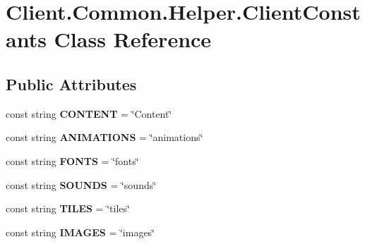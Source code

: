 \hypertarget{classClient_1_1Common_1_1Helper_1_1ClientConstants}{\section{Client.\-Common.\-Helper.\-Client\-Constants Class Reference}
\label{classClient_1_1Common_1_1Helper_1_1ClientConstants}
}
\subsection*{Public Attributes}
\begin{DoxyCompactItemize}
\item 
\hypertarget{classClient_1_1Common_1_1Helper_1_1ClientConstants_a0c4448ce7b1a345e18f40fb7f1c963c7}{const string {\bfseries C\-O\-N\-T\-E\-N\-T} = \char`\"{}Content\char`\"{}}\label{classClient_1_1Common_1_1Helper_1_1ClientConstants_a0c4448ce7b1a345e18f40fb7f1c963c7}

\item 
\hypertarget{classClient_1_1Common_1_1Helper_1_1ClientConstants_a60ef84449ad577edc5a9271ff579ba8f}{const string {\bfseries A\-N\-I\-M\-A\-T\-I\-O\-N\-S} = \char`\"{}animations\char`\"{}}\label{classClient_1_1Common_1_1Helper_1_1ClientConstants_a60ef84449ad577edc5a9271ff579ba8f}

\item 
\hypertarget{classClient_1_1Common_1_1Helper_1_1ClientConstants_a52c908ccd26ad80c739e26faaebf5a5c}{const string {\bfseries F\-O\-N\-T\-S} = \char`\"{}fonts\char`\"{}}\label{classClient_1_1Common_1_1Helper_1_1ClientConstants_a52c908ccd26ad80c739e26faaebf5a5c}

\item 
\hypertarget{classClient_1_1Common_1_1Helper_1_1ClientConstants_acccad18fa5b18e5e42bda30a778883be}{const string {\bfseries S\-O\-U\-N\-D\-S} = \char`\"{}sounds\char`\"{}}\label{classClient_1_1Common_1_1Helper_1_1ClientConstants_acccad18fa5b18e5e42bda30a778883be}

\item 
\hypertarget{classClient_1_1Common_1_1Helper_1_1ClientConstants_a73802f084c13346a0b9f747aade18b01}{const string {\bfseries T\-I\-L\-E\-S} = \char`\"{}tiles\char`\"{}}\label{classClient_1_1Common_1_1Helper_1_1ClientConstants_a73802f084c13346a0b9f747aade18b01}

\item 
\hypertarget{classClient_1_1Common_1_1Helper_1_1ClientConstants_a1ffb72ae453b43952c3ced93de626a15}{const string {\bfseries I\-M\-A\-G\-E\-S} = \char`\"{}images\char`\"{}}\label{classClient_1_1Common_1_1Helper_1_1ClientConstants_a1ffb72ae453b43952c3ced93de626a15}


\end{DoxyCompactItemize}
